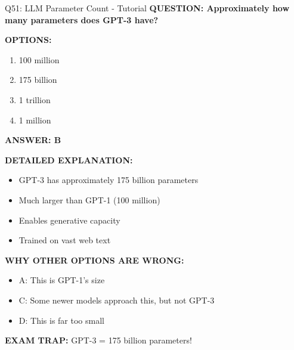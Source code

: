 \documentclass[8pt]{beamer}
\begin{document}
	\begin{frame}{Q51: LLM Parameter Count - Tutorial}
		\fontsize{6.5}{7.5}\selectfont
		\textbf{QUESTION: Approximately how many parameters does GPT-3 have?}
		
		\vspace{0.1cm}
		\textbf{OPTIONS:}
		\begin{enumerate}
			\item 100 million
			\item 175 billion
			\item 1 trillion
			\item 1 million
		\end{enumerate}
		
		\vspace{0.1cm}
		\textcolor{myblue}{\textbf{ANSWER: B}}
		
		\vspace{0.1cm}
		\textbf{DETAILED EXPLANATION:}
		\begin{itemize}
			\item GPT-3 has approximately 175 billion parameters
			\item Much larger than GPT-1 (100 million)
			\item Enables generative capacity
			\item Trained on vast web text
		\end{itemize}
		
		\vspace{0.1cm}
		\textcolor{myred}{\textbf{WHY OTHER OPTIONS ARE WRONG:}}
		\begin{itemize}
			\item \textcolor{myred}{A:} This is GPT-1's size
			\item \textcolor{myred}{C:} Some newer models approach this, but not GPT-3
			\item \textcolor{myred}{D:} This is far too small
		\end{itemize}
		
		\textcolor{myred}{\textbf{EXAM TRAP:}} GPT-3 = \textcolor{myblue}{175 billion} parameters!
	\end{frame}
	
\end{document}

